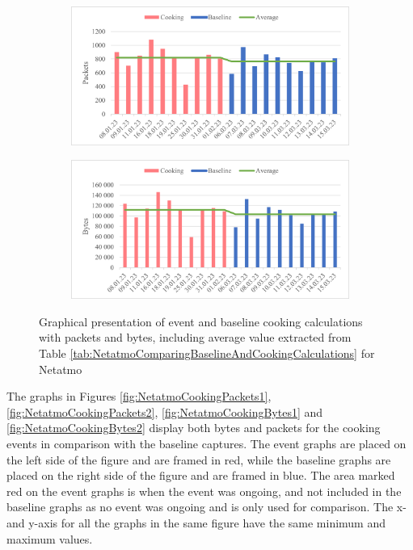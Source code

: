 \begin{figure}[H]
    \centering
    \begin{subfigure}{0.8\textwidth}
       \centering
       \includegraphics[width=1\hsize]{figures/Netatmo_Cooking_Calculations_Packets.png} 
    \end{subfigure}
    \begin{subfigure}{0.8\textwidth}
        \centering
        \includegraphics[width=1\hsize]{figures/Netatmo_Cooking_Calculations_Bytes.png} 
    \end{subfigure}
    \caption{Graphical presentation of event and baseline cooking calculations with packets and bytes, including average value extracted from Table \ref{tab:NetatmoComparingBaselineAndCookingCalculations} for Netatmo}
    \label{fig:NetatmoCookingCalculations}
\end{figure}

The graphs in Figures \ref{fig:NetatmoCookingPackets1}, \ref{fig:NetatmoCookingPackets2}, \ref{fig:NetatmoCookingBytes1} and \ref{fig:NetatmoCookingBytes2} display both bytes and packets for the cooking events in comparison with the baseline captures. The event graphs are placed on the left side of the figure and are framed in red, while the baseline graphs are placed on the right side of the figure and are framed in blue. The area marked red on the event graphs is when the event was ongoing, and not included in the baseline graphs as no event was ongoing and is only used for comparison. The x- and y-axis for all the graphs in the same figure have the same minimum and maximum values. 

